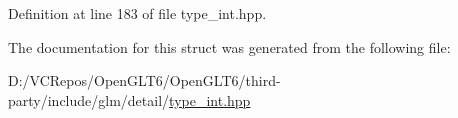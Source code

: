 Definition at line 183 of file type\+\_\+int.\+hpp.



The documentation for this struct was generated from the following file\+:\begin{DoxyCompactItemize}
\item 
D\+:/\+V\+C\+Repos/\+Open\+G\+L\+T6/\+Open\+G\+L\+T6/third-\/party/include/glm/detail/\mbox{\hyperlink{type__int_8hpp}{type\+\_\+int.\+hpp}}\end{DoxyCompactItemize}
